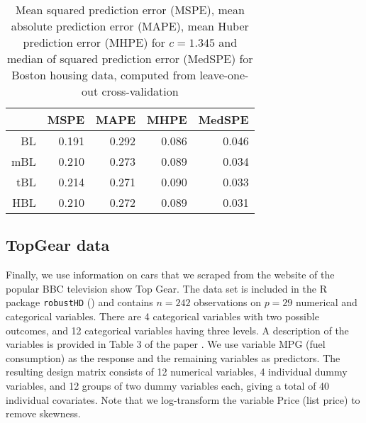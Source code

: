 \documentclass[11pt]{article}
\theoremstyle{plain}
\theoremstyle{definition}
\begin{document}
\begin{table}[ht]
\caption{Mean squared prediction error (MSPE), mean absolute prediction error (MAPE), mean Huber prediction error (MHPE) for $c=1.345$ and median of squared prediction error (MedSPE) for Boston housing data, computed from leave-one-out cross-validation}
\begin{center}
\begin{tabular}{rrrrr}
  \hline
 & MSPE & MAPE & MHPE & MedSPE \\ 
  \hline
BL & 0.191 & 0.292 & 0.086 & 0.046 \\ 
  mBL & 0.210 & 0.273 & 0.089 & 0.034 \\ 
  tBL & 0.214 & 0.271 & 0.090 & 0.033 \\ 
  HBL & 0.210 & 0.272 & 0.089 & 0.031 \\ 
   \hline
\end{tabular}
\end{center}
\label{tab:boston}
\end{table}




\subsection{TopGear data}
\label{subsec:TopGear}

Finally, we use information on cars that we scraped from the website of the popular BBC television show Top Gear. The data set is included in the R package {\tt robustHD} (\cite{A21}) and contains $n = 242$ observations on $p = 29$ numerical and categorical variables. There are 4 categorical variables with two possible outcomes, and 12 categorical variables having three levels. A description of the variables is provided in Table 3 of the paper \cite{ACG16}. We use variable MPG (fuel consumption) as the response and the remaining variables as predictors. The resulting design matrix consists of 12 numerical variables, 4 individual dummy variables, and 12 groups of two dummy variables each, giving a total of 40 individual covariates. Note that we log-transform the variable Price (list price) to remove skewness. 
\end{document}
